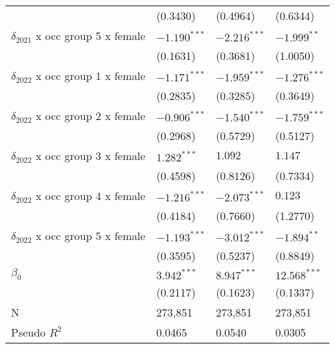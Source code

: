 \begin{tabular}{llll}
                                         &           (0.3430) &           (0.4964) &           (0.6344) \\
$\delta_{2021}$ x occ group 5 x female   &     $-1.190^{***}$ &     $-2.216^{***}$ &      $-1.999^{**}$ \\
                                         &           (0.1631) &           (0.3681) &           (1.0050) \\
$\delta_{2022}$ x occ group 1 x female   &     $-1.171^{***}$ &     $-1.959^{***}$ &     $-1.276^{***}$ \\
                                         &           (0.2835) &           (0.3285) &           (0.3649) \\
$\delta_{2022}$ x occ group 2 x female   &     $-0.906^{***}$ &     $-1.540^{***}$ &     $-1.759^{***}$ \\
                                         &           (0.2968) &           (0.5729) &           (0.5127) \\
$\delta_{2022}$ x occ group 3 x female   &      $1.282^{***}$ &            $1.092$ &            $1.147$ \\
                                         &           (0.4598) &           (0.8126) &           (0.7334) \\
$\delta_{2022}$ x occ group 4 x female   &     $-1.216^{***}$ &     $-2.073^{***}$ &            $0.123$ \\
                                         &           (0.4184) &           (0.7660) &           (1.2770) \\
$\delta_{2022}$ x occ group 5 x female   &     $-1.193^{***}$ &     $-3.012^{***}$ &      $-1.894^{**}$ \\
                                         &           (0.3595) &           (0.5237) &           (0.8849) \\
$\beta_0$                                &      $3.942^{***}$ &      $8.947^{***}$ &     $12.568^{***}$ \\
                                         &           (0.2117) &           (0.1623) &           (0.1337) \\
N                                        &            273,851 &            273,851 &            273,851 \\
Pseudo $R^2$                             &             0.0465 &             0.0540 &             0.0305 \\
\bottomrule
\end{tabular}

